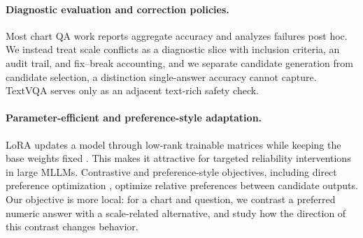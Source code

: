 \paragraph{Diagnostic evaluation and correction policies.}
Most chart QA work reports aggregate accuracy and analyzes failures post hoc. We instead treat scale conflicts as a diagnostic slice with inclusion criteria, an audit trail, and fix--break accounting, and we separate candidate generation from candidate selection, a distinction single-answer accuracy cannot capture. TextVQA \citep{singh2019towards} serves only as an adjacent text-rich safety check.

\paragraph{Parameter-efficient and preference-style adaptation.}
LoRA updates a model through low-rank trainable matrices while keeping the base weights fixed \citep{hu2021lora}. This makes it attractive for targeted reliability interventions in large MLLMs. Contrastive and preference-style objectives, including direct preference optimization \citep{rafailov2023direct}, optimize relative preferences between candidate outputs. Our objective is more local: for a chart and question, we contrast a preferred numeric answer with a scale-related alternative, and study how the direction of this contrast changes behavior.
